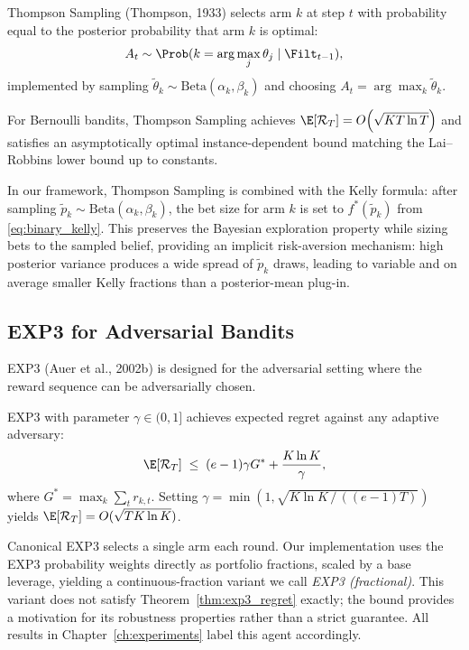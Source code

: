 Thompson Sampling (Thompson, 1933) selects arm $k$ at step $t$ with
probability equal to the posterior probability that arm $k$ is optimal:
\[
    A_t \sim \Prob(k = \arg\max_j \theta_j \mid \Filt_{t-1}),
\]
implemented by sampling $\tilde\theta_k \sim \text{Beta}(\alpha_k, \beta_k)$
and choosing $A_t = \arg\max_k \tilde\theta_k$.

\begin{theorem}
\label{thm:ts_regret}
For Bernoulli bandits, Thompson Sampling achieves
$\E[\mathcal{R}_T] = O\!\left(\sqrt{KT\ln T}\right)$
and satisfies an asymptotically optimal instance-dependent bound matching the
Lai--Robbins lower bound up to constants.
\end{theorem}

In our framework, Thompson Sampling is combined with the Kelly formula:
after sampling $\tilde p_k \sim \text{Beta}(\alpha_k,\beta_k)$, the bet size
for arm $k$ is set to $f^*(\tilde p_k)$ from \eqref{eq:binary_kelly}.
This preserves the Bayesian exploration property while sizing bets to the
sampled belief, providing an implicit risk-aversion mechanism: high posterior
variance produces a wide spread of $\tilde p_k$ draws, leading to variable
and on average smaller Kelly fractions than a posterior-mean plug-in.

\subsection{EXP3 for Adversarial Bandits}

EXP3 (Auer et al., 2002b) is designed for the adversarial setting where the
reward sequence can be adversarially chosen.

\begin{theorem}
\label{thm:exp3_regret}
EXP3 with parameter $\gamma \in (0,1]$ achieves expected regret against any
adaptive adversary:
\[
    \E[\mathcal{R}_T] \;\leq\; (e-1)\gamma G^* + \frac{K\ln K}{\gamma},
\]
where $G^* = \max_k \sum_t r_{k,t}$.  Setting
$\gamma = \min\!\left(1, \sqrt{K\ln K\,/\,((e-1)T)}\right)$
yields $\E[\mathcal{R}_T] = O(\sqrt{TK\ln K})$.
\end{theorem}

\begin{remark}
\label{rem:exp3_variant}
Canonical EXP3 selects a single arm each round.  Our implementation uses the
EXP3 probability weights directly as portfolio fractions, scaled by a base
leverage, yielding a continuous-fraction variant we call \emph{EXP3 (fractional)}.
This variant does not satisfy Theorem~\ref{thm:exp3_regret} exactly; the bound
provides a motivation for its robustness properties rather than a strict
guarantee.  All results in Chapter~\ref{ch:experiments} label this agent
accordingly.
\end{remark}

